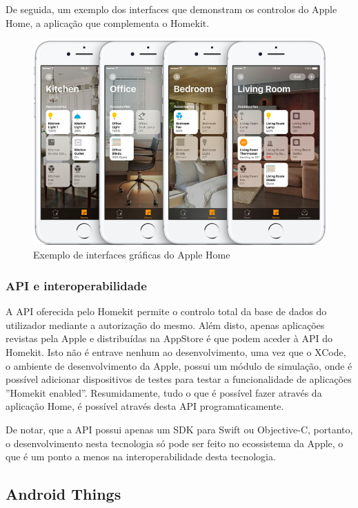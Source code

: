 De seguida, um exemplo dos interfaces que demonstram os controlos do Apple Home, a aplicação que complementa o Homekit.

\begin{figure}[H]
  \centering
        \includegraphics[scale=0.65]{img/homekit.png}
  \caption{Exemplo de interfaces gráficas do Apple Home}
\end{figure}

\subsubsection{API e interoperabilidade}

A API oferecida pelo Homekit permite o controlo total da base de dados do utilizador mediante a autorização do mesmo. Além disto, apenas aplicações revistas pela Apple e distribuídas na AppStore é que podem aceder à API do Homekit. Isto não é entrave nenhum ao desenvolvimento, uma vez que o XCode, o ambiente de desenvolvimento da Apple, possui um módulo de simulação, onde é possível adicionar dispositivos de testes para testar a funcionalidade de aplicações ''Homekit enabled''. Resumidamente, tudo o que é possível fazer através da aplicação Home, é possível através desta API programaticamente.

De notar, que a API possui apenas um SDK para Swift ou Objective-C, portanto, o desenvolvimento nesta tecnologia só pode ser feito no ecossistema da Apple, o que é um ponto a menos na interoperabilidade desta tecnologia.

\subsection{Android Things}

